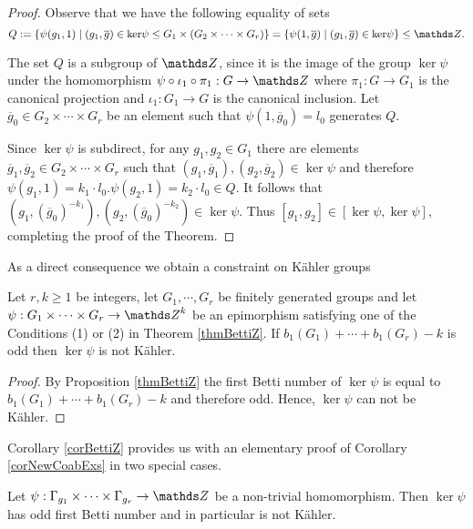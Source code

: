 \begin{proof}
 Observe that we have the following equality of sets
 \[
  Q:=\left\{\psi(g_1,1)\mid (g_1,\overline{g})\in \ker \psi\leq G_1\times (G_2\times \cdots \times G_r)\right\} = \left\{\psi(1,\overline{g})\mid (g_1,\overline{g})\in \ker \psi \right\}\leq \ZZ.
 \]
  
 The set $Q$ is a subgroup of $\ZZ$, since it is the image of the group $\ker \psi$ under the homomorphism $\psi\circ \iota_1\circ \pi_1:G\rightarrow \ZZ$ where $\pi_1:G\rightarrow G_1$ is the canonical projection and $\iota_1: G_1 \rightarrow G$ is the canonical inclusion. Let $\overline{g}_0\in G_2\times \cdots \times G_r$ be an element such that $\psi(1,\overline{g}_0)=l_0$ generates $Q$.
 
 Since $\ker \psi$ is subdirect, for any $g_1, g_2 \in G_1$ there are elements $\overline{g}_1,\overline{g}_2 \in G_2 \times \cdots \times G_r$ such that $(g_1,\overline{g}_1),(g_2,\overline{g}_2)\in \ker\psi$ and therefore $\psi(g_1,1)=k_1\cdot l_0. \psi(g_2,1)=k_2\cdot l_0 \in Q$. It follows that $(g_1,(\overline{g}_0)^{-k_1}), (g_2,(\overline{g}_0)^{-k_2})\in \ker \psi$. Thus $\left[g_1,g_2\right] \in \left[\ker \psi,\ker \psi\right]$, completing the proof of the Theorem.
\end{proof}

As a direct consequence we obtain a constraint on K\"ahler groups

\begin{corollary}
 Let $r,k\geq 1$ be integers, let $G_1,\cdots, G_r$ be finitely generated groups and let $\psi :G_1\times \cdots \times G_r\rightarrow \ZZ^k$ be an epimorphism satisfying one of the Conditions (1) or (2) in Theorem \ref{thmBettiZ}. If $b_1(G_1)+\cdots + b_1(G_r) - k$ is odd then $\ker \psi$ is not K\"ahler.
 \label{corBettiZ}
\end{corollary}
\begin{proof}
 By Proposition \ref{thmBettiZ} the first Betti number of $\ker \psi$ is equal to $b_1(G_1)+\cdots + b_1(G_r) - k$ and therefore odd. Hence, $\ker \psi$ can not be K\"ahler.
\end{proof}

Corollary \ref{corBettiZ} provides us with an elementary proof of Corollary \ref{corNewCoabExs} in two special cases.
\begin{corollary}
 Let $\psi: \G_{g_1}\times \dots \times \G_{g_r}\rightarrow \ZZ$ be a non-trivial homomorphism. Then $\ker \psi$ has odd first Betti number and in particular is not K\"ahler.
\end{corollary}

